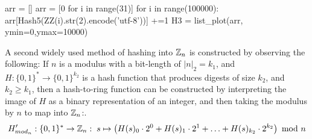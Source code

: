 \begin{example}
\begin{sagesilent}
arr = []
arr = [0 for i in range(31)]
for i in range(100000):
    arr[Hash5(ZZ(i).str(2).encode('utf-8'))] +=1
H3 = list_plot(arr, ymin=0,ymax=10000)
\end{sagesilent}
\begin{center}
\end{center}
\end{example}


A second widely used method of hashing into $\mathbb{Z}_n$ is constructed by observing the following: If $n$ is a modulus with a bit-length of $|n|_2=k_1$, and $H:\{0,1\}^*\to \{0,1\}^{k_2}$ is a hash function that produces digests of size $k_2$, and $k_2\geq k_1$, then a hash-to-ring function can be constructed by interpreting the image of $H$ as a binary representation of an integer, and then taking the modulus by $n$ to map into $\mathbb{Z}_n$:.
\begin{equation}
H'_{mod_n}: \{0,1\}^* \to \mathbb{Z}_n: \; s \mapsto
\left(H(s)_0\cdot 2^0 + H(s)_1\cdot 2^1 + \ldots + H(s)_{k_2}\cdot 2^{k_2}\right) \text{ mod } n
\end{equation}

